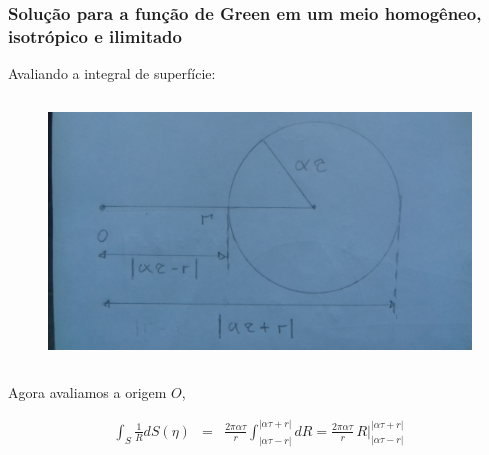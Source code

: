 \documentclass[xcolor=table]{beamer}
\begin{document}
\begin{frame}
\frametitle{\textbf{Solu\c{c}\~ao para a fun\c{c}\~ao de Green em um meio homog\^eneo, isotr\'opico e ilimitado}}
\begin{flushleft}
    \textcolor{red!60!black}{Avaliando a integral de superf\'icie:}
\end{flushleft}
\begin{columns}        
  \begin{column}{0.60\textwidth}    
  \begin{figure}[h!]   
    \includegraphics[scale=0.06]{Figura/Fig6}       
  \end{figure}
  \end{column}
\end{columns}

\begin{flushleft}
Agora avaliamos a origem $O$, 
\end{flushleft}
\begin{eqnarray}
  \label{ten1}
   \int_{S} \frac{1}{R} dS(\eta)  &=& \frac{2\pi \alpha \tau}{r} \int_{\left| \alpha\tau -r \right|}^{\left| \alpha\tau +r \right|}  dR  = \frac{2\pi \alpha \tau}{r}\, R \Big|_{\left| \alpha\tau -r \right|}^{\left| \alpha\tau +r \right|} \, 
\end{eqnarray}

\end{frame}%
\end{document}

